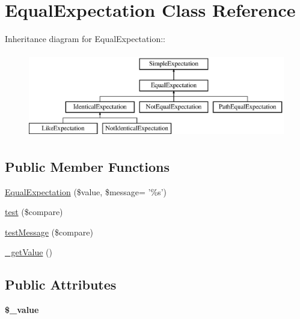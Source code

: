 \hypertarget{class_equal_expectation}{
\section{EqualExpectation Class Reference}
\label{class_equal_expectation}
}
Inheritance diagram for EqualExpectation::\begin{figure}[H]
\begin{center}
\leavevmode
\includegraphics[height=3.70861cm]{class_equal_expectation}
\end{center}
\end{figure}
\subsection*{Public Member Functions}
\begin{DoxyCompactItemize}
\item 
\hyperlink{class_equal_expectation_a13f738ba95ce51f758a18775a16e2e17}{EqualExpectation} (\$value, \$message= '\%s')
\item 
\hyperlink{class_equal_expectation_a412b216b1ba36e37d342aebb821ccb55}{test} (\$compare)
\item 
\hyperlink{class_equal_expectation_a707aa690ff9312ff1b99733d859f7f6f}{testMessage} (\$compare)
\item 
\hyperlink{class_equal_expectation_a60ce0cd029990b304408f0a73edfb93e}{\_\-getValue} ()
\end{DoxyCompactItemize}
\subsection*{Public Attributes}
\begin{DoxyCompactItemize}
\item 
\hypertarget{class_equal_expectation_a12891f9f993335f779d29e6fa2660592}{
{\bfseries \$\_\-value}}
\label{class_equal_expectation_a12891f9f993335f779d29e6fa2660592}

\end{DoxyCompactItemize}


